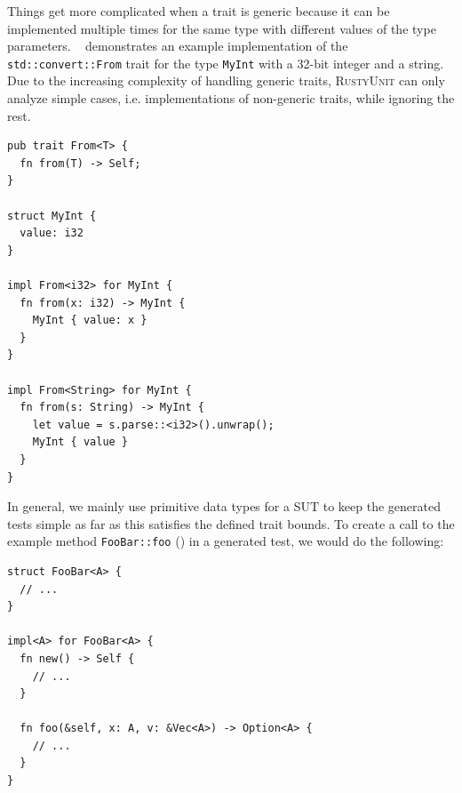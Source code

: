 \documentclass[paper=a4,%
  twoside,%
  BCOR4mm,%
  abstract=true,%
  toc=bibliography,%
  chapterprefix=true,%
  toc=bibliographynumbered,%
  open=right,%
  english,%
  pagesize=pdftex]{scrreprt}
\newcommand{\tech}{\textsc{RustyUnit}\xspace}
\newcommand{\sut}{\ac{SUT}\xspace}
\begin{document}
Things get more complicated when a trait is generic because it can be implemented multiple times for the same type with different values of the type parameters. ~ demonstrates an example implementation of the \texttt{std::convert::From} trait for the type \texttt{MyInt} with a 32-bit integer and a string. Due to the increasing complexity of handling generic traits, \tech can only analyze simple cases, i.e. implementations of non-generic traits, while ignoring the rest.

\begin{lstlisting}[style=boxed, caption={Example implementation oft the std::convert::From trait from the Rust standard library}, label=lst:from-trait-example]
pub trait From<T> {
  fn from(T) -> Self;
}

struct MyInt {
  value: i32
}

impl From<i32> for MyInt {
  fn from(x: i32) -> MyInt {
    MyInt { value: x }
  }
}

impl From<String> for MyInt {
  fn from(s: String) -> MyInt {
    let value = s.parse::<i32>().unwrap();
    MyInt { value }
  }
}
\end{lstlisting}


In general, we mainly use primitive data types for a \sut to keep the generated tests simple as far as this satisfies the defined trait bounds. To create a call to the example method \texttt{FooBar::foo} () in a generated test, we would do the following:

\begin{lstlisting}[style=boxed, caption={A generic type A is used in multiple parameters and return value}, label=lst:generic-type-used-in-multiple-params]
struct FooBar<A> { 
  // ...
}

impl<A> for FooBar<A> {
  fn new() -> Self {
    // ...
  }

  fn foo(&self, x: A, v: &Vec<A>) -> Option<A> {
    // ...
  }
}
\end{lstlisting}
\end{document}

